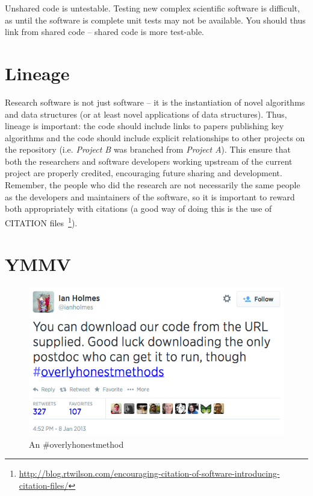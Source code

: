 \documentclass[conference]{IEEEtran}
\begin{document}
Unshared code is untestable. Testing new complex scientific software is
difficult, as until the software is complete unit tests may not be
available. You should thus link from shared code -- shared code is
more test-able.

\section{Lineage} 

Research software is not just software -- it is the instantiation of
novel algorithms and data structures (or at least novel applications
of data structures). Thus, lineage is important: the code should
include links to papers publishing key algorithms and the
code should include explicit relationships to other projects on the
repository (i.e. {\emph{Project B}} was branched from {\emph{Project
A}}). This ensure that both the researchers and software developers
working upstream of the current project are properly credited,
encouraging future sharing and development. Remember, the people who
did the research are not necessarily the same people as the developers
and maintainers of the software, so it is important to reward both
appropriately with citations (a good way of doing this is the use of
CITATION
files~\footnote{\url{http://blog.rtwilson.com/encouraging-citation-of-software-introducing-citation-files/}}).


\section{YMMV}

\begin{figure}[!ht]
\centering
\includegraphics[width=\columnwidth]{overlyhonesttweet.png}
\caption{An \#overlyhonestmethod}
\label{fig:overlyhonestmethod} 
\end{figure}
\end{document}
